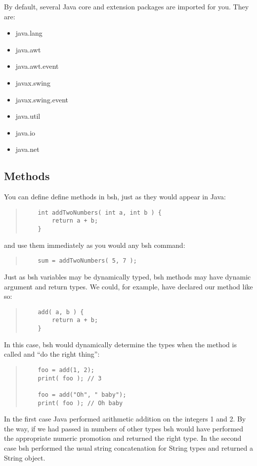 \documentclass[twoside,11pt]{article}
\renewcommand{\_}{\texttt{\symbol{95}}}
\begin{document}
By default, several Java core and extension packages are imported for
you.  They are:
\begin{itemize}
\item java.lang
\item java.awt
\item java.awt.event
\item javax.swing
\item javax.swing.event
\item java.util
\item java.io
\item java.net
\end{itemize}

\subsection{Methods}

You can define define methods in bsh, just as they would appear in Java:
\begin{quote}
\begin{verbatim}
    int addTwoNumbers( int a, int b ) {
        return a + b;
    }
\end{verbatim}
\end{quote}
and use them immediately as you would any bsh command:
\begin{quote}
\begin{verbatim}
    sum = addTwoNumbers( 5, 7 );
\end{verbatim}
\end{quote}
Just as bsh variables may be dynamically typed, bsh methods may have
dynamic argument and return types.  We could, for example, have declared
our method like so:
\begin{quote}
\begin{verbatim}
    add( a, b ) {
        return a + b;
    }
\end{verbatim}
\end{quote}
In this case, bsh would dynamically determine the types when the method is
called and ``do the right thing'':
\begin{quote}
\begin{verbatim}
    foo = add(1, 2);
    print( foo ); // 3

    foo = add("Oh", " baby");
    print( foo ); // Oh baby
\end{verbatim}
\end{quote}
In the first case Java performed arithmetic addition on the integers 1 and 2.
By the way, if we had passed in numbers of other types bsh would have performed
the appropriate numeric promotion and returned the right type.  In the second
case bsh performed the usual string concatenation for String types and
returned a String object.
\end{document}
